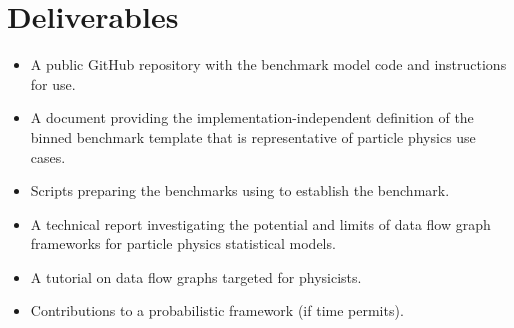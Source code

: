 \section{Deliverables}

\begin{itemize}
	\item A public GitHub repository with the benchmark model code and instructions for use.
	\item A document providing the implementation-independent definition of the binned benchmark template that is representative of particle physics use cases.
	\item Scripts preparing the benchmarks using  to establish the  benchmark.
	\item A technical report investigating the potential and limits of data flow graph frameworks for particle physics statistical models.
	\item A tutorial on data flow graphs targeted for physicists.
	\item Contributions to a probabilistic framework (if time permits).
\end{itemize}
